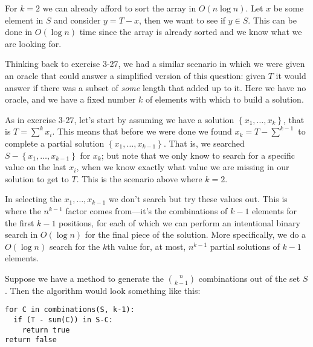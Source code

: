 \documentclass{report}
\begin{document}
For $k=2$ we can already afford to sort the array in $O(n\log n)$. Let $x$ be some element in $S$ and consider $y=T-x$, then we want to see if $y\in S$. This can be done in $O(\log n)$ time since the array is already sorted and we know what we are looking for.

Thinking back to exercise 3-27, we had a similar scenario in which we were given an oracle that could answer a simplified version of this question: given $T$ it would answer if there was a subset of \emph{some} length that added up to it. Here we have no oracle, and we have a fixed number $k$ of elements with which to build a solution.

As in exercise 3-27, let's start by assuming we have a solution $\left\{ x_1,\ldots,x_k \right\}$, that is $T = \sum^k x_i$. This means that before we were done we found $x_k = T - \sum^{k-1}$ to complete a partial solution $\left\{ x_1,\ldots,x_{k-1}\right\}$. That is, we searched $S - \left\{x_1,\ldots,x_{k-1}\right\}$ for $x_k$; but note that we only know to search for a specific value on the last $x_i$, when we know exactly what value we are missing in our solution to get to $T$. This is the scenario above where $k=2$.

In selecting the $x_1,\ldots,x_{k-1}$ we don't search but try these values out. This is where the $n^{k-1}$ factor comes from---it's the combinations of $k-1$ elements for the first $k-1$ positions, for each of which we can perform an intentional binary search in $O(\log n)$ for the final piece of the solution. More specifically, we do a $O(\log n)$ search for the $k$th value for, at most, $n^{k-1}$ partial solutions of $k-1$ elements.

Suppose we have a method to generate the $\binom{n}{k-1}$ combinations out of the set $S$. Then the algorithm would look something like this:
\begin{lstlisting}
for C in combinations(S, k-1):
  if (T - sum(C)) in S-C:
    return true
return false
\end{lstlisting}
\end{document}
